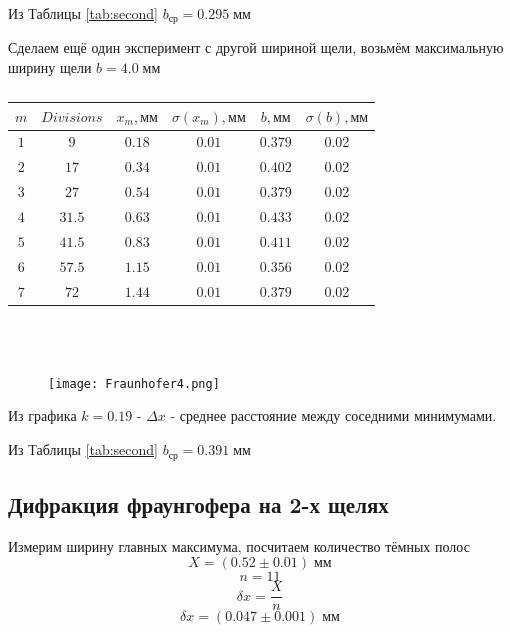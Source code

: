 \documentclass[a4paper,12pt]{article} %
\begin{document}
Из Таблицы \ref{tab:second} $b_{\text{ср}} = 0.295\; \text{мм}$ 

Сделаем ещё один эксперимент с другой шириной щели, возьмём максимальную ширину щели $b = 4.0\; \text{мм}$

\begin{table}[H]
\begin{center}
\begin{tabular}{|c|c|c|c|c|c|}\hline
$m$ & $Divisions$ & $x_m, \text{мм}$ & $\sigma(x_m), \text{мм}$ & $b, \text{мм}$ & $\sigma(b), \text{мм}$\\\hline
$1$ & $9$  & $0.18$ & $0.01$ & $ 0.379$ & 0.02\\\hline
$2$ & $17$ & $0.34$ & $0.01$ & $0.402$ & 0.02\\\hline
$3$ & $27$ & $0.54$ & $0.01$ & $0.379$ & 0.02\\\hline
$4$ & $31.5$ & $0.63$ & $0.01$ & $0.433$ & 0.02\\\hline
$5$ & $41.5$ & $0.83$ & $0.01$ & $0.411$ & 0.02\\\hline
$6$ & $57.5$ & $1.15$ & $0.01$ & $0.356$ & 0.02\\\hline
$7$ & $72$ & $1.44$ & $0.01$ & $0.379$ & 0.02\\\hline
\end{tabular}\\~\\
\end{center}
\caption{\label{tab:third}}
\end{table}

\begin{figure}[H]
\texttt{[image: Fraunhofer4.png]}
\end{figure}

Из графика  $k = 0.19$ -  $\Delta x$ - среднее расстояние между соседними минимумами.

Из Таблицы \ref{tab:second} $b_{\text{ср}} = 0.391\; \text{мм}$ 


\subsection{Дифракция фраунгофера на 2-х щелях}

Измерим ширину главных максимума, посчитаем количество тёмных полос
\begin{equation*}
    X = (0.52 \pm 0.01)\; \text{мм}
\end{equation*}
\begin{equation*}
    n = 11
\end{equation*}
\begin{equation*}
    \delta x = \frac{X}{n}
\end{equation*}
\begin{equation*}
    \delta x = (0.047 \pm 0.001)\; \text{мм}
\end{equation*}
\end{document}
